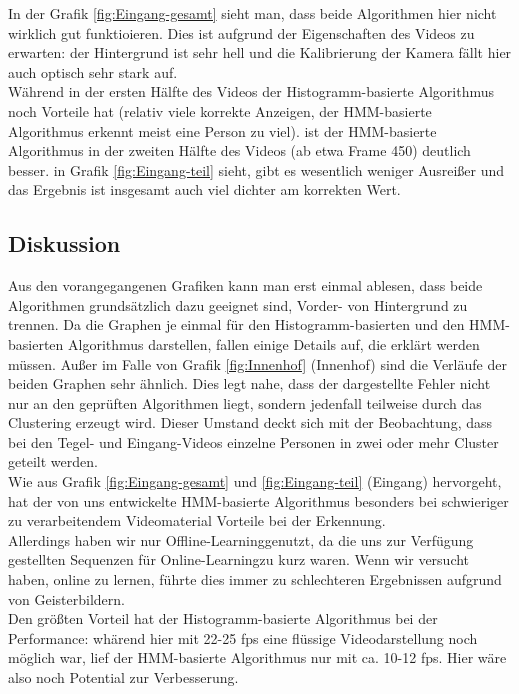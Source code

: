 In der Grafik \ref{fig:Eingang-gesamt} sieht man, dass beide Algorithmen hier nicht wirklich gut funktioieren.
Dies ist aufgrund der Eigenschaften des Videos zu erwarten: der Hintergrund ist sehr hell und die Kalibrierung der Kamera fällt hier auch optisch sehr stark auf.\\
Während in der ersten Hälfte des Videos der Histogramm-basierte Algorithmus noch Vorteile hat (relativ viele korrekte Anzeigen, der HMM-basierte Algorithmus erkennt meist eine Person zu viel). ist der HMM-basierte Algorithmus in der zweiten Hälfte des Videos (ab etwa Frame 450) deutlich besser.
in Grafik \ref{fig:Eingang-teil} sieht, gibt es wesentlich weniger Ausreißer und das Ergebnis ist insgesamt auch viel dichter am korrekten Wert.\\

\subsection{Diskussion}
\label{sec:diskuss}
Aus den vorangegangenen Grafiken kann man erst einmal ablesen, dass beide Algorithmen grundsätzlich dazu geeignet sind, Vorder- von Hintergrund zu trennen.
Da die Graphen je einmal für den Histogramm-basierten und den HMM-basierten Algorithmus darstellen, fallen einige Details auf, die erklärt werden müssen.
Außer im Falle von Grafik \ref{fig:Innenhof} (Innenhof) sind die Verläufe der beiden Graphen sehr ähnlich.
Dies legt nahe, dass der dargestellte Fehler nicht nur an den geprüften Algorithmen liegt, sondern jedenfall teilweise durch das Clustering erzeugt wird.
Dieser Umstand deckt sich mit der Beobachtung, dass bei den Tegel- und Eingang-Videos einzelne Personen in zwei oder mehr Cluster geteilt werden.\\
Wie aus Grafik \ref{fig:Eingang-gesamt} und \ref{fig:Eingang-teil} (Eingang) hervorgeht, hat der von uns entwickelte HMM-basierte Algorithmus besonders bei schwieriger zu verarbeitendem Videomaterial Vorteile bei der Erkennung.\\
Allerdings haben wir nur \glqq Offline-Learning\grqq genutzt, da die uns zur Verfügung gestellten Sequenzen für \glqq Online-Learning\grqq zu kurz waren.
Wenn wir versucht haben, online zu lernen, führte dies immer zu schlechteren Ergebnissen aufgrund von Geisterbildern.\\
Den größten Vorteil hat der Histogramm-basierte Algorithmus bei der Performance: whärend hier mit 22-25 fps eine flüssige Videodarstellung noch möglich war, lief der HMM-basierte Algorithmus nur mit ca. 10-12 fps. Hier wäre also noch Potential zur Verbesserung.

